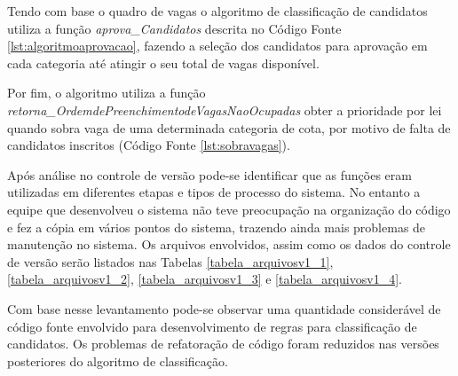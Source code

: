 Tendo com base o quadro de vagas o algoritmo de classificação de candidatos utiliza a função \textit{aprova\_Candidatos} descrita no Código Fonte \ref{lst:algoritmoaprovacao}, fazendo a seleção dos candidatos para aprovação em cada categoria até atingir o seu total de vagas disponível. 



Por fim, o algoritmo utiliza a função \textit{retorna\_OrdemdePreenchimentodeVagasNaoOcupadas} obter a prioridade por lei quando sobra vaga de uma determinada categoria de cota, por motivo de falta de candidatos inscritos (Código Fonte \ref{lst:sobravagas}).



Após análise no controle de versão pode-se identificar que as funções eram utilizadas em diferentes etapas e tipos de processo do sistema. No entanto a equipe que desenvolveu o sistema não teve preocupação na organização do código e fez a cópia em vários pontos do sistema, trazendo ainda mais problemas de manutenção no sistema. Os arquivos envolvidos, assim como os dados do controle de versão serão listados nas Tabelas \ref{tabela_arquivosv1_1}, \ref{tabela_arquivosv1_2}, \ref{tabela_arquivosv1_3} e \ref{tabela_arquivosv1_4}.




Com base nesse levantamento pode-se observar uma quantidade considerável de código fonte envolvido para desenvolvimento de regras para classificação de candidatos. Os problemas de refatoração de código foram reduzidos nas versões posteriores do algoritmo de classificação.
